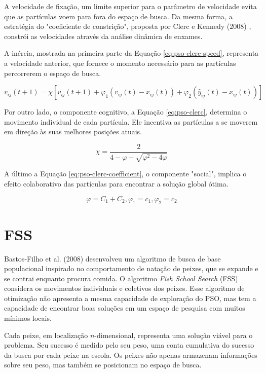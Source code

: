 A velocidade de fixação, um limite superior para o parâmetro de velocidade evita que as partículas voem para fora do espaço de busca. Da mesma forma, a estratégia do "coeficiente de constrição", proposta por Clerc e Kennedy (2008) \cite{clerc2002particle}, constrói as velocidades através da análise dinâmica de enxames.

A inércia, mostrada na primeira parte da Equação \ref{eq:pso-clerc-speed}, representa a velocidade anterior, que fornece o momento necessário para as partículas percorrerem o espaço de busca.

\begin{equation} \label{eq:pso-clerc-speed}
    v_{ij}(t+1) = \chi[v_{ij}(t+1) + \varphi_1(v_{ij}(t) - x_{ij}(t)) + \varphi_2(\hat{y}_{ij}(t) - x_{ij}(t))]
\end{equation}

Por outro lado, o componente cognitivo, a Equação \ref{eq:pso-clerc}, determina o movimento individual de cada partícula. Ele incentiva as partículas a se moverem em direção às suas melhores posições atuais. 

\begin{equation} \label{eq:pso-clerc}
    \chi = \frac{2}{4 - \varphi - \sqrt{\varphi^2 - 4\varphi}}
\end{equation}

A último a Equação \ref{eq:pso-clerc-coefficient}, o componente "social", implica o efeito colaborativo das partículas para encontrar a solução global ótima.

\begin{equation} \label{eq:pso-clerc-coefficient}
    \varphi = C_1 + C_2, \varphi_1 = c_1, \varphi_2 = c_2
\end{equation}

\section{FSS}
\label{sec-fss}

Bastos-Filho et al. (2008) \cite{bastos2008novel} desenvolveu um algoritmo de busca de base populacional inspirado no comportamento de natação de peixes, que se expande e se contrai enquanto procura comida. O algoritmo \textit{Fish School Search} (FSS) considera os movimentos individuais e coletivos dos peixes. Esse algoritmo de otimização não apresenta a mesma capacidade de exploração do PSO, mas tem a capacidade de encontrar boas soluções em um espaço de pesquisa com muitos mínimos locais.

Cada peixe, em localização $n$-dimensional, representa uma solução viável para o problema. Seu sucesso é medido pelo seu peso, uma conta cumulativa do sucesso da busca por cada peixe na escola. Os peixes não apenas armazenam informações sobre seu peso, mas também se posicionam no espaço de busca.

